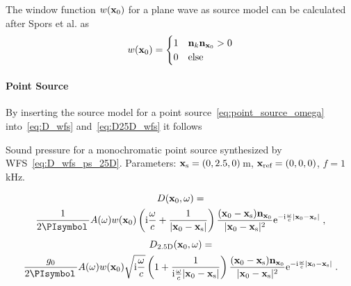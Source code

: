 The window function $w(\mathbf{x}_0)$ for a plane wave as source model can be
calculated after Spors et al. as\autocite{Spors2008}
%
\begin{equation}
    w(\x_0) = 
    \begin{cases}
        1 & \n_k \n_{\x_0} > 0 \\
        0 & \text{else}
    \end{cases}
    \label{eq:w_pw}
\end{equation}
%



\paragraph{Point Source}
%
%
By inserting the source model for a point
source~\eqref{eq:point_source_omega}
into~\eqref{eq:D_wfs} and~\eqref{eq:D25D_wfs} it follows
%
\begin{marginfigure}
    \centering
    \ft
    
    \caption{Sound pressure for a monochromatic point source synthesized by
        \twohalfD \ac{WFS}~\eqref{eq:D_wfs_ps_25D}. Parameters: $\mathbf{x}_\text{s} = (0,2.5,0)$\,m,
        $\mathbf{x}_\text{ref} = (0,0,0)$, $f = 1$\,kHz.
        }
\end{marginfigure}
%
\begin{multline}
    D(\x_0,\omega) = \\
    \frac{1}{2\PI} A(\omega) w(\x_0) \left(\I\omegac +
    \frac{1}{|\x_0-\xs|} \right) \frac{(\x_0-\xs)\n_{\x_0}}{|\x_0-\xs|^2}
    \E^{-\I\omegac |\x_0-\xs|} \qc
    \label{eq:D_wfs_ps_without_approximation}
\end{multline}
%
\begin{multline}
    D_\twohalfD(\x_0,\omega) = \\
    \frac{g_0}{2\PI} A(\omega) w(\x_0) \sqrt{\I\omegac} \left(
    1 + \frac{1}{\I\omegac|\x_0-\xs|}
    \right) \frac{(\x_0-\xs) \n_{\x_0}}{|\x_0-\xs|^2} \E^{-\I\omegac |\x_0-\xs|} \qp
    \label{eq:D_wfs_ps_25D_without_approximation}
\end{multline}
